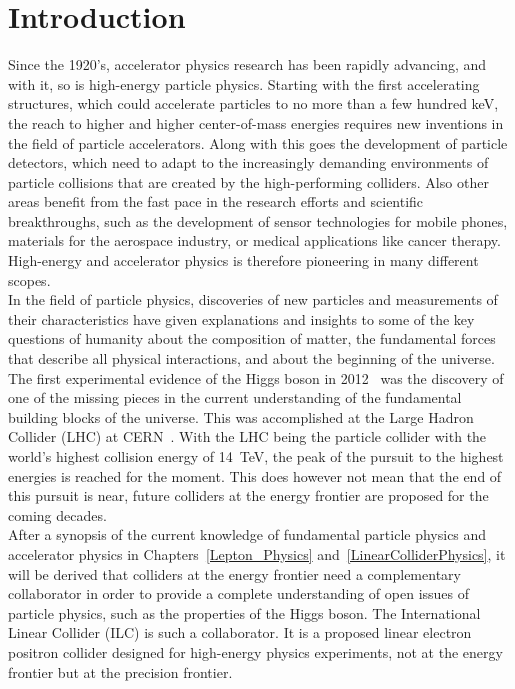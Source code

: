 \chapter{Introduction}
\label{Introduction}
Since the 1920's, accelerator physics research has been rapidly advancing, and with it, so is high-energy particle physics.
Starting with the first accelerating structures, which could accelerate particles to no more than a few hundred \si{\keV}, the reach to higher and higher center-of-mass energies requires new inventions in the field of particle accelerators.
Along with this goes the development of particle detectors, which need to adapt to the increasingly demanding environments of particle collisions that are created by the high-performing colliders.
Also other areas benefit from the fast pace in the research efforts and scientific breakthroughs, such as the development of sensor technologies for mobile phones, materials for the aerospace industry, or medical applications like cancer therapy.
High-energy and accelerator physics is therefore pioneering in many different scopes.
\\In the field of particle physics, discoveries of new particles and measurements of their characteristics have given explanations and insights to some of the key questions of humanity about the composition of matter, the fundamental forces that describe all physical interactions, and about the beginning of the universe.
The first experimental evidence of the Higgs boson in 2012~\cite{Higgs,Higgs2} was the discovery of one of the missing pieces in the current understanding of the fundamental building blocks of the universe.
This was accomplished at the Large Hadron Collider (LHC) at CERN~\cite{LHC_CERN}.
With the LHC being the particle collider with the world's highest collision energy of \SI{14}{\TeV}, the peak of the pursuit to the highest energies is reached for the moment.
This does however not mean that the end of this pursuit is near, future colliders at the energy frontier are proposed for the coming decades.
\\After a synopsis of the current knowledge of fundamental particle physics and accelerator physics in Chapters~\ref{Lepton_Physics} and~\ref{LinearColliderPhysics}, it will be derived that colliders at the energy frontier need a complementary collaborator in order to provide a complete understanding of open issues of particle physics, such as the properties of the Higgs boson.
The International Linear Collider (ILC) is such a collaborator.
It is a proposed linear electron positron collider designed for high-energy physics experiments, not at the energy frontier but at the precision frontier.

